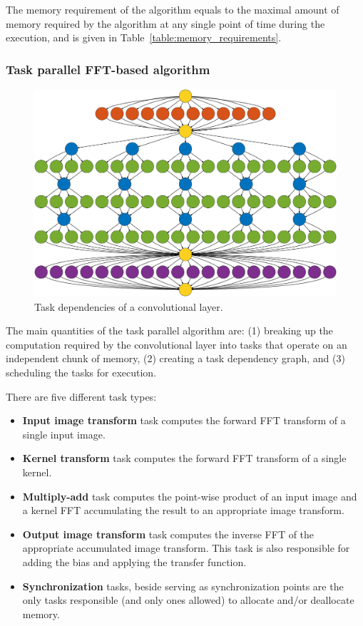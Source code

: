 \documentclass[conference]{./IEEEtran/IEEEtran}
\begin{document}
  The memory requirement of the algorithm equals to the maximal amount
  of memory required by the algorithm at any single point of time
  during the execution, and is given in
  Table~\ref{table:memory_requirements}.

\subsubsection{Task parallel FFT-based algorithm}

  \begin{figure}
    \begin{center}
      \includegraphics[width=0.95\columnwidth]{fig/deps}
    \end{center}
    \caption{Task dependencies of a convolutional layer.}
    \label{fig:task_deps}
  \end{figure}

  The main quantities of the task parallel algorithm are: (1) breaking
  up the computation required by the convolutional layer into tasks
  that operate on an independent chunk of memory, (2) creating a task
  dependency graph, and (3) scheduling the tasks for execution.

  There are five different task types:

  \begin{itemize}
    \item {\color{zred}\bf Input image transform} task computes the
      forward FFT transform of a single input image.
    \item {\color{zblue}\bf Kernel transform} task computes the forward
      FFT transform of a single kernel.
    \item {\color{zgreen}\bf Multiply-add} task computes the
      point-wise product of an input image and a kernel FFT
      accumulating the result to an appropriate image transform.
    \item {\color{zpurple}\bf Output image transform} task computes
      the inverse FFT of the appropriate accumulated image transform.
      This task is also responsible for adding the bias and applying
      the transfer function.
    \item {\color{zyellow}\bf Synchronization} tasks, beside serving
      as synchronization points are the only tasks responsible (and
      only ones allowed) to allocate and/or deallocate memory.
  \end{itemize}
\end{document}
